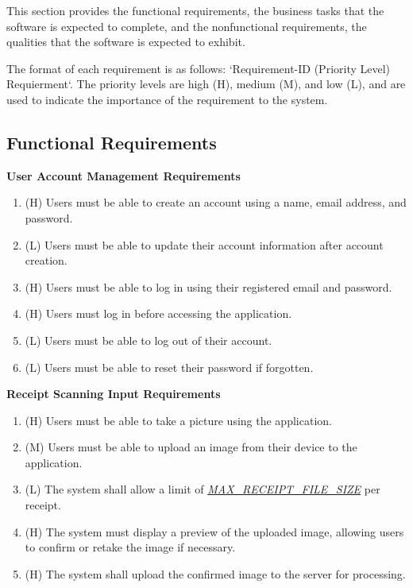 \documentclass[12pt]{article}
\begin{document}
This section provides the functional requirements, the business tasks that the
software is expected to complete, and the nonfunctional requirements, the
qualities that the software is expected to exhibit.

The format of each requirement is as follows: `Requirement-ID (Priority Level)
Requierment`. The priority levels are high (H), medium (M), and low (L), and are
used to indicate the importance of the requirement to the system.

\subsection{Functional Requirements}

\textbf{User Account Management Requirements}
\begin{enumerate}[label=FR-UAM-\arabic*]
  \item (H) Users must be able to create an account using a name, email
  address, and password.
  \item (L) Users must be able to update their account information after account
  creation.
  \item (H) Users must be able to log in using their registered email and password.
  \item (H) Users must log in before accessing the application.
  \item (L) Users must be able to log out of their account.
  \item (L) Users must be able to reset their password if forgotten.
\end{enumerate}

\textbf{Receipt Scanning Input Requirements}
\begin{enumerate}[label=FR-IP-\arabic*]
  \item (H) Users must be able to take a picture using the application.
  \item (M) Users must be able to upload an image from their device to the
  application.
  \item (L) The system shall allow a limit of \hyperref[Table:AuxConstants]{\textit{MAX\_RECEIPT\_FILE\_SIZE}} per receipt.
  \item (H) The system must display a preview of the uploaded image, allowing users
  to confirm or retake the image if necessary. 
  \item (H) The system shall upload the confirmed image to the server for processing.
\end{enumerate}
\end{document}
